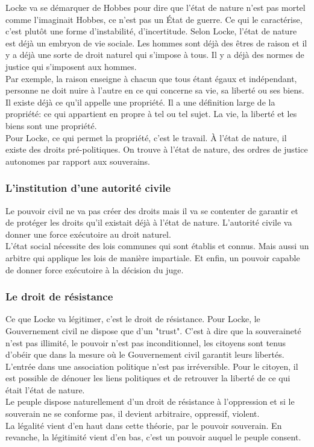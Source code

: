 \documentclass[10pt, a4paper, openany]{book}
\begin{document}
Locke va se démarquer de Hobbes pour dire que l'état de nature n'est pas mortel comme l'imaginait Hobbes, ce n'est pas un État de guerre. Ce qui le caractérise, c'est plutôt une forme d'instabilité, d'incertitude. Selon Locke, l'état de nature est déjà un embryon de vie sociale. Les hommes sont déjà des êtres de raison et il y a déjà une sorte de droit naturel qui s'impose à tous. Il y a déjà des normes de justice qui s'imposent aux hommes. \\
Par exemple, la raison enseigne à chacun que tous étant égaux et indépendant, personne ne doit nuire à l'autre en ce qui concerne sa vie, sa liberté ou ses biens. Il existe déjà ce qu'il appelle une propriété. Il a une définition large de la propriété: ce qui appartient en propre à tel ou tel sujet. La vie, la liberté et les biens sont une propriété. \\
Pour Locke, ce qui permet la propriété, c'est le travail. À l'état de nature, il existe des droits pré-politiques. On trouve à l'état de nature, des ordres de justice autonomes par rapport aux souverains. 

\subsubsection{L'institution d'une autorité civile}

Le pouvoir civil ne va pas créer des droits mais il va se contenter de garantir et de protéger les droits qu'il existait déjà à l'état de nature. L'autorité civile va donner une force exécutoire au droit naturel. \\
L'état social nécessite des lois communes qui sont établis et connus. Mais aussi un arbitre qui applique les lois de manière impartiale. Et enfin, un pouvoir capable de donner force exécutoire à la décision du juge. 

\subsubsection{Le droit de résistance}

Ce que Locke va légitimer, c'est le droit de résistance. Pour Locke, le Gouvernement civil ne dispose que d'un "trust". C'est à dire que la souveraineté n'est pas illimité, le pouvoir n'est pas inconditionnel, les citoyens sont tenus d'obéir que dans la mesure où le Gouvernement civil garantit leurs libertés. \\
L'entrée dans une association politique n'est pas irréversible. Pour le citoyen, il est possible de dénouer les liens politiques et de retrouver la liberté de ce qui était l'état de nature. \\
Le peuple dispose naturellement d'un droit de résistance à l'oppression et si le souverain ne se conforme pas, il devient arbitraire, oppressif, violent. \\
La légalité vient d'en haut dans cette théorie, par le pouvoir souverain. En revanche, la légitimité vient d'en bas, c'est un pouvoir auquel le peuple consent. 
\end{document}
